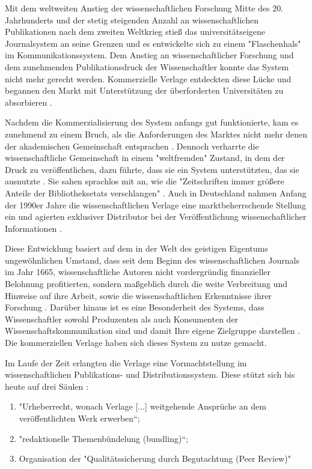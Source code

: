 Mit dem weltweiten Anstieg der wissenschaftlichen Forschung Mitte des 20. Jahrhunderts und der stetig steigenden Anzahl an wissenschaftlichen Publikationen nach dem zweiten Weltkrieg stieß das universitätseigene Journalsystem an seine Grenzen und es entwickelte sich zu einem "Flaschenhals" \cite{epaa_Weiner_2001} im Kommunikationssystem. Dem Anstieg an wissenschaftlicher Forschung und dem zunehmenden Publikationsdruck der Wissenschaftler konnte das System nicht mehr gerecht werden. Kommerzielle Verlage entdeckten diese Lücke und begannen den Markt mit Unterstützung der überforderten Universitäten zu absorbieren \cite{Hirschi_2015_buch_oa}.

Nachdem die Kommerzialisierung des System anfangs gut funktionierte, kam es zunehmend zu einem Bruch, als die Anforderungen des Marktes nicht mehr denen der akademischen Gemeinschaft entsprachen \cite{epaa_Weiner_2001}. Dennoch verharrte die wissenschaftliche Gemeinschaft in einem "weltfremden" Zustand, in dem der Druck zu veröffentlichen, dazu führte, dass sie ein System unterstützten, das sie ausnutzte \cite{epaa_Weiner_2001}. Sie sahen sprachlos mit an, wie die "Zeitschriften immer größere Anteile der Bibliotheksetats verschlangen" \cite{hagner_2015_sache_buches}. Auch in Deutschland nahmen Anfang der 1990er Jahre die wissenschaftlichen Verlage eine marktbeherrschende Stellung ein und agierten exklusiver Distributor bei der Veröffentlichung wissenschaftlicher Informationen \cite{schloegl_2005} \cite{offhaus_2012_institutionelle_repos}.

Diese Entwicklung basiert auf dem in der Welt des geistigen Eigentums ungewöhnlichen Umstand, dass seit dem Beginn des wissenschaftlichen Journals im Jahr 1665, wissenschaftliche Autoren nicht vordergründig finanzieller Belohnung profitierten, sondern maßgeblich durch die weite Verbreitung und Hinweise auf ihre Arbeit, sowie die wissenschaftlichen Erkenntnisse ihrer Forschung \cite{albert_2006_open_implications}. Darüber hinaus ist es eine Besonderheit des Systems, dass Wissenschaftler sowohl Produzenten als auch Konsumenten der Wissenschaftskommunikation sind und damit Ihre eigene Zielgruppe darstellen \cite{Hess_2006}. Die kommerziellen Verlage haben sich dieses System zu nutze gemacht.

Im Laufe der Zeit erlangten die Verlage eine Vormachtstellung im wissenschaftlichen Publikations- und Distributionssystem. Diese stützt sich bis heute auf drei Säulen \cite{offhaus_2012_institutionelle_repos} \cite{bargheer_2006_open}:
\begin{enumerate}
\item "Urheberrecht, wonach Verlage [...] weitgehende Ansprüche an dem veröffentlichten Werk erwerben“;
\item "redaktionelle Themenbündelung (bundling)“;
\item Organisation der "Qualitätssicherung durch Begutachtung (Peer Review)"
\end{enumerate}

